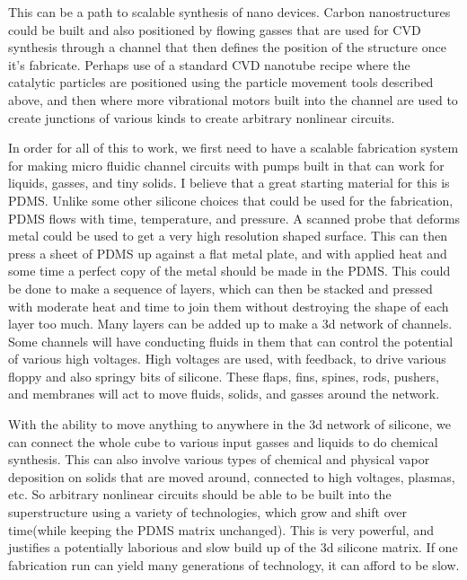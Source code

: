 This can be a path to scalable synthesis of nano devices. Carbon
nanostructures could be built and also positioned by flowing gasses that
are used for CVD synthesis through a channel that then defines the
position of the structure once it's fabricate. Perhaps use of a standard
CVD nanotube recipe where the catalytic particles are positioned using
the particle movement tools described above, and then where more
vibrational motors built into the channel are used to create junctions
of various kinds to create arbitrary nonlinear circuits.

In order for all of this to work, we first need to have a scalable
fabrication system for making micro fluidic channel circuits with pumps
built in that can work for liquids, gasses, and tiny solids. I believe
that a great starting material for this is PDMS. Unlike some other
silicone choices that could be used for the fabrication, PDMS flows with
time, temperature, and pressure. A scanned probe that deforms metal
could be used to get a very high resolution shaped surface. This can
then press a sheet of PDMS up against a flat metal plate, and with
applied heat and some time a perfect copy of the metal should be made in
the PDMS. This could be done to make a sequence of layers, which can
then be stacked and pressed with moderate heat and time to join them
without destroying the shape of each layer too much. Many layers can be
added up to make a 3d network of channels. Some channels will have
conducting fluids in them that can control the potential of various high
voltages. High voltages are used, with feedback, to drive various floppy
and also springy bits of silicone. These flaps, fins, spines, rods,
pushers, and membranes will act to move fluids, solids, and gasses
around the network.

With the ability to move anything to anywhere in the 3d network of
silicone, we can connect the whole cube to various input gasses and
liquids to do chemical synthesis. This can also involve various types of
chemical and physical vapor deposition on solids that are moved around,
connected to high voltages, plasmas, etc. So arbitrary nonlinear
circuits should be able to be built into the superstructure using a
variety of technologies, which grow and shift over time(while keeping
the PDMS matrix unchanged). This is very powerful, and justifies a
potentially laborious and slow build up of the 3d silicone matrix. If
one fabrication run can yield many generations of technology, it can
afford to be slow.

